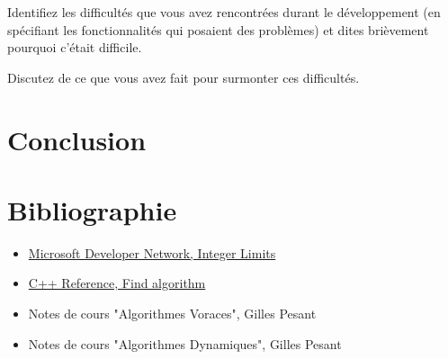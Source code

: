 \documentclass[10pt,a4paper]{article}
\begin{document}
\og 

    Identifiez les difficultés que vous avez rencontrées durant le développement (en spécifiant les fonctionnalités qui posaient des problèmes) et dites brièvement pourquoi c'était difficile.
    
    Discutez de ce que vous avez fait pour surmonter ces difficultés.

\fg

\section{Conclusion}

\section{Bibliographie}

\begin{itemize}
	\item \href{http://msdn.microsoft.com/en-us/library/296az74e.aspx}{Microsoft Developer Network, Integer Limits}
	\item \href{http://www.cplusplus.com/reference/algorithm/find/}{C++ Reference, Find algorithm}
	\item Notes de cours "Algorithmes Voraces", Gilles Pesant
	\item Notes de cours "Algorithmes Dynamiques", Gilles Pesant
\end{itemize}
\end{document}
